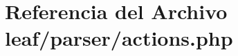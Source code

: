 \hypertarget{actions_8php}{\section{Referencia del Archivo leaf/parser/actions.php}
\label{actions_8php}
}
